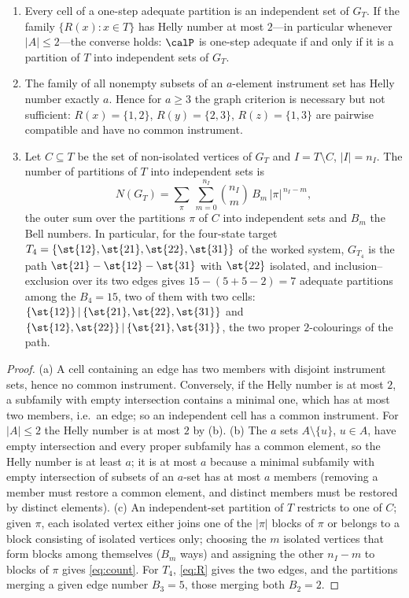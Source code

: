 \begin{theorem}\label{thm:adequacy}
\begin{enumerate}[label=(\alph*),leftmargin=2em,itemsep=1pt]
\item Every cell of a one-step adequate partition is an independent set of $G_T$. If the family $\{R(x):x\in T\}$ has Helly number at most $2$---in particular whenever $|A|\le 2$---the converse holds: $\calP$ is one-step adequate if and only if it is a partition of $T$ into independent sets of $G_T$.
\item The family of all nonempty subsets of an $a$-element instrument set has Helly number exactly $a$. Hence for $a\ge 3$ the graph criterion is necessary but not sufficient: $R(x)=\{1,2\}$, $R(y)=\{2,3\}$, $R(z)=\{1,3\}$ are pairwise compatible and have no common instrument.
\item Let $C\subseteq T$ be the set of non-isolated vertices of $G_T$ and $I=T\setminus C$, $|I|=n_I$. The number of partitions of $T$ into independent sets is
\begin{equation}\label{eq:count}
N(G_T)=\sum_{\pi}\ \sum_{m=0}^{n_I}\binom{n_I}{m}\,B_m\,|\pi|^{\,n_I-m},
\end{equation}
the outer sum over the partitions $\pi$ of $C$ into independent sets and $B_m$ the Bell numbers. In particular, for the four-state target $T_4=\{\st{12},\st{21},\st{22},\st{31}\}$ of the worked system, $G_{T_4}$ is the path $\st{21}-\st{12}-\st{31}$ with $\st{22}$ isolated, and inclusion--exclusion over its two edges gives $15-(5+5-2)=7$ adequate partitions among the $B_4=15$, two of them with two cells: $\{\st{12}\}\,|\,\{\st{21},\st{22},\st{31}\}$ and $\{\st{12},\st{22}\}\,|\,\{\st{21},\st{31}\}$, the two proper $2$-colourings of the path.
\end{enumerate}
\end{theorem}

\begin{proof}
(a) A cell containing an edge has two members with disjoint instrument sets, hence no common instrument. Conversely, if the Helly number is at most $2$, a subfamily with empty intersection contains a minimal one, which has at most two members, i.e.\ an edge; so an independent cell has a common instrument. For $|A|\le 2$ the Helly number is at most $2$ by (b). (b) The $a$ sets $A\setminus\{u\}$, $u\in A$, have empty intersection and every proper subfamily has a common element, so the Helly number is at least $a$; it is at most $a$ because a minimal subfamily with empty intersection of subsets of an $a$-set has at most $a$ members (removing a member must restore a common element, and distinct members must be restored by distinct elements). (c) An independent-set partition of $T$ restricts to one of $C$; given $\pi$, each isolated vertex either joins one of the $|\pi|$ blocks of $\pi$ or belongs to a block consisting of isolated vertices only; choosing the $m$ isolated vertices that form blocks among themselves ($B_m$ ways) and assigning the other $n_I-m$ to blocks of $\pi$ gives \eqref{eq:count}. For $T_4$, \eqref{eq:R} gives the two edges, and the partitions merging a given edge number $B_3=5$, those merging both $B_2=2$.
\end{proof}

